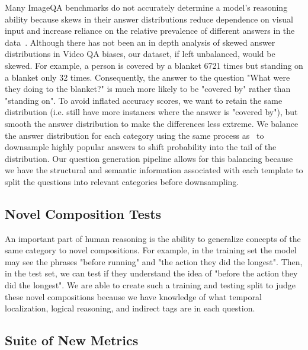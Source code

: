 \documentclass[10pt,twocolumn,letterpaper]{article}
\newcommand{\mgm}[1]{{\color{cyan}{mgm: #1}}}
\begin{document}
    Many ImageQA benchmarks do not accurately determine a model's reasoning ability because skews in their answer distributions reduce dependence on visual input and increase reliance on the relative prevalence of different answers in the data~\cite{hudson2019gqa,goyal2017making}. Although there has not been an in depth analysis of skewed answer distributions in Video QA biases, our dataset, if left unbalanced, would be skewed. For example, a person is covered by a blanket 6721 times but standing on a blanket only 32 times. Consequently, the answer to the question "What were they doing to the blanket?" is much more likely to be "covered by" rather than "standing on". To avoid inflated accuracy scores, we want to retain the same distribution (i.e. still have more instances where the answer is "covered by"), but smooth the answer distribution to make the differences less extreme. We balance the answer distribution for each category using the same process as~\cite{hudson2019gqa} to downsample highly popular answers to shift probability into the tail of the distribution. Our question generation pipeline allows for this balancing because we have the structural and semantic information associated with each template to split the questions into relevant categories before downsampling. 

    \mgm{need to explain this in more detail and update it with the new way that I've been doing it. }
    
   \subsection{Novel Composition Tests}
    
    An important part of human reasoning is the ability to generalize concepts of the same category to novel compositions. For example, in the training set the model may see the phrases "before running" and "the action they did the longest". Then, in the test set, we can test if they understand the idea of "before the action they did the longest". We are able to create such a training and testing split to judge these novel compositions because we have knowledge of what temporal localization, logical reasoning, and indirect tags are in each question.
    
    \mgm{Add in more detial about other compositional tests as well. Also, maybe some more detail into how I make the compositinal tests}

    \subsection{Suite of New Metrics}
    
\end{document}
